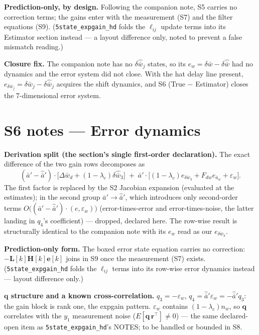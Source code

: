 \documentclass[11pt,a4paper,fontset=none]{ctexart}
\begin{document}
\textbf{Prediction-only, by design.}  Following the companion note, S5
carries no correction terms; the gains enter with the measurement (S7) and
the filter equations (S9).  (\texttt{5state\_expgain\_hd} folds the
$\ell_{ij}$ update terms into its Estimator section instead --- a layout
difference only, noted to prevent a false mismatch reading.)

\textbf{Closure fix.}  The companion note has no
$\delta\hat{\bar{w}}_j$ states, so its $e_w = \delta\bar{w}-\delta\hat{\bar{w}}$
had no dynamics and the error system did not close.  With the hat delay
line present, $e_{\delta\bar{w}_j} = \delta\bar{w}_j - \delta\hat{\bar{w}}_j$
acquires the shift dynamics, and S6 (True $-$ Estimator) closes the
7-dimensional error system.

\section*{S6 notes --- Error dynamics}

\textbf{Derivation split (the section's single first-order declaration).}
The exact difference of the two gain rows decomposes as
\begin{equation*}
(\bar{a}' - \hat{\bar{a}}')\cdot
\bigl[\Delta\bar{w}_d + (1-\lambda_c)\delta\hat{\bar{w}}_3\bigr]
\;+\;
\bar{a}'\cdot\bigl[(1-\lambda_c)e_{\delta\bar{w}_3}
 + F_{dw}e_{\bar{a}_w} + \varepsilon_w\bigr].
\end{equation*}
The first factor is replaced by the S2 Jacobian expansion (evaluated at the
estimates); in the second group $\bar{a}' \to \hat{\bar{a}}'$, which
introduces only second-order terms
$O\bigl((\bar{a}'-\hat{\bar{a}}')\cdot(e,\varepsilon_w)\bigr)$
(error-times-error and error-times-noise, the latter landing in $q_4$'s
coefficient) --- dropped, declared here.  The row-wise result is
structurally identical to the companion note with its $e_w$ read as our
$e_{\delta\bar{w}_3}$.

\textbf{Prediction-only form.}  The boxed error state equation carries no
correction: $-\mathbf{L}[k]\mathbf{H}[k]\mathbf{e}[k]$ joins in S9 once the
measurement (S7) exists.  (\texttt{5state\_expgain\_hd} folds the
$\ell_{ij}$ terms into its row-wise error dynamics instead --- layout
difference only.)

\textbf{$\mathbf{q}$ structure and a known cross-correlation.}
$q_3 = -\varepsilon_w$, $q_4 = \hat{\bar{a}}'\varepsilon_w =
-\hat{\bar{a}}'q_3$: the gain block is rank one, the expgain pattern.
$\varepsilon_w$ contains $(1-\lambda_c)n_w$, so $\mathbf{q}$ correlates
with the $y_1$ measurement noise ($E[\mathbf{q}\,\mathbf{r}^{\top}] \neq 0$)
--- the same declared-open item as \texttt{5state\_expgain\_hd}'s NOTES;
to be handled or bounded in S8.
\end{document}
